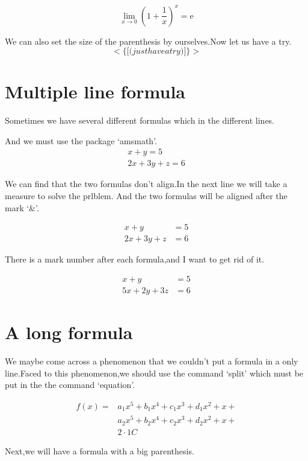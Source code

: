 \documentclass[UTF8]{ctexart}
\begin{document}
\[
  \lim_{x\to 0}\left(1+\frac{1}{x}\right)^x=\mathrm{e}
\]

We can also set the size of the parenthesis by ourselves.Now let us have a try.
\[
  \Bigg< \bigg\{ \Big[ \big( just  have  a  try \big) \Big] \bigg\} \Bigg>
\]

\vspace{3cm}
\part {Multiple line formula}
Sometimes we have several different formulas which in the different lines.

And we must use the package `amsmath'.
\begin{gather}
x+y=5\\
2x+3y+z=6
\end{gather}

We can find that the two formulas don't align.In the next line we will take a measure to solve the prlblem.
And the two formulas will be aligned after the mark `\&'.

\begin{align}
x+y&=5\\
2x+3y+z&=6
\end{align}

There is a mark number after each formula,and I want to get rid of it.

\begin{align*}
x+y&=5\\
5x+2y+3z&=6
\end{align*}

\vspace{2cm}
\part{A long formula}
We maybe come across a phenomenon that we couldn't put a formula in a only line.Faced to this phenomenon,we should use the command `split' which must be put in the the command `equation'.

\begin{equation}
\begin{split}
f(x)=&a_1x^5+b_1x^4+c_1x^3+d_1x^2+x+\\
     &a_2x^5+b_2x^4+c_2x^3+d_2x^2+x+\\
     &2\cdot 1C
\end{split}
\end{equation}

Next,we will have a formula with a big parenthesis.
\end{document}
